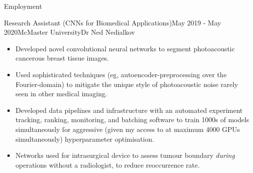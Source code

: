 \begin{rSection}{Employment}

\begin{rSubsection}{Research Assistant (CNNs for Biomedical Applications)}{May 2019 - May 2020}{McMaster University}{Dr Ned Nedialkov}
  \begin{itemize}
    \addtolength\itemsep{-0.5em}
    \item Developed novel convolutional neural networks to segment photoacoustic cancerous breast tissue images.
    \item Used sophisticated techniques (eg, autoencoder-preprocessing over the Fourier-domain) to mitigate the unique style of photoacoustic noise rarely seen in other medical imaging.
    \item Developed data pipelines and infrastructure with an automated experiment tracking, ranking, monitoring, and batching software to train 1000s of models simultaneously for aggressive (given my access to at maximum 4000 GPUs simultaneously) hyperparameter optimisation.
    \item Networks used for intrasurgical device to assess tumour boundary \emph{during} operations without a radiologist, to reduce reoccurrence rate.
  \end{itemize}
\end{rSubsection}



\end{rSection}